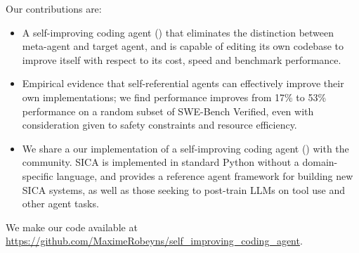 Our contributions are:
\vspace{-5pt}
\begin{itemize}
\item  A self-improving coding agent () that eliminates the
distinction between meta-agent and target agent, and is capable of editing its own codebase to
improve itself with respect to its cost, speed and benchmark performance.
\item Empirical evidence that self-referential agents can effectively improve
      their own implementations; we find performance improves from 17\% to 53\% performance on a random subset of SWE-Bench Verified, even with consideration given to safety constraints and
      resource efficiency.
\item We share a our implementation of a self-improving coding agent () with the community.  SICA is implemented in standard Python without a domain-specific language, and provides a reference agent framework for building new SICA systems, as well as those seeking to post-train LLMs on tool use and other agent tasks.
\end{itemize}

We make our code available at {\small \url{https://github.com/MaximeRobeyns/self\_improving\_coding\_agent}}.
